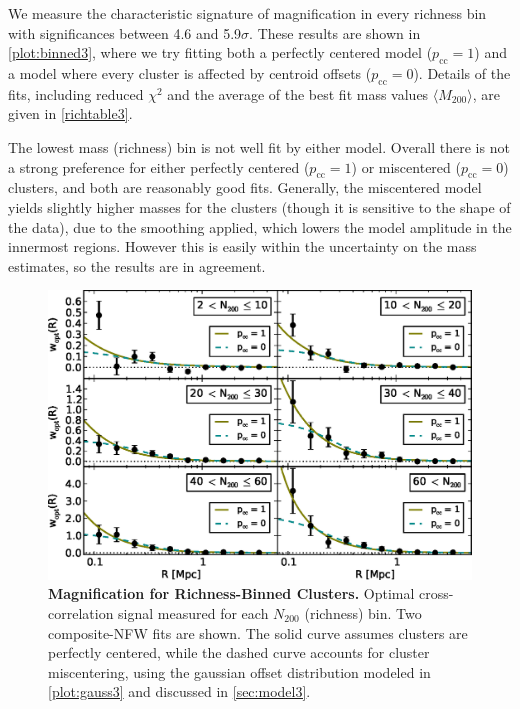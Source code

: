 We measure the characteristic signature of magnification in every richness bin with significances between 4.6 and 5.9$\sigma$. These results are shown in \autoref{plot:binned3}, where we try fitting both a perfectly centered model ($p_{\mathrm{cc}}=1$) and a model where every cluster is affected by centroid offsets ($p_{\mathrm{cc}}=0$). Details of the fits, including reduced $\chi^2$ and the average of the best fit mass values $\langle M_{200} \rangle$, are given in \autoref{richtable3}.

The lowest mass (richness) bin is not well fit by either model. Overall there is not a strong preference for either perfectly centered ($p_{\mathrm{cc}}=1$) or miscentered ($p_{\mathrm{cc}}=0$) clusters, and both are reasonably good fits. Generally, the miscentered model yields slightly higher masses for the clusters (though it is sensitive to the shape of the data), due to the smoothing applied, which lowers the model amplitude in the innermost regions. However this is easily within the uncertainty on the mass estimates, so the results are in agreement.


\begin{figure}
\begin{center}
\includegraphics[scale=0.9]{plots_ch3/wopt_panel_fcc0and1_U.eps}
\caption[Magnification for Richness-Binned Clusters]{{\bf Magnification for Richness-Binned Clusters.} Optimal cross-correlation signal measured for each $N_{200}$ (richness) bin. Two composite-\ac{NFW} fits are shown. The solid curve assumes clusters are perfectly centered, while the dashed curve accounts for cluster miscentering, using the gaussian offset distribution modeled in \autoref{plot:gauss3} and discussed in \autoref{sec:model3}.}
\label{plot:binned3}
\end{center}
\end{figure}

